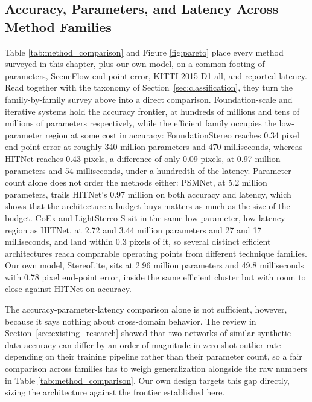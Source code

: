 \subsection{Accuracy, Parameters, and Latency Across Method Families}
Table \ref{tab:method_comparison} and Figure \ref{fig:pareto} place
every method surveyed in this chapter, plus our own model, on a common
footing of parameters, SceneFlow end-point error, KITTI 2015 D1-all, and
reported latency. Read together with the taxonomy of
Section~\ref{sec:classification}, they turn the family-by-family survey
above into a direct comparison. Foundation-scale and iterative systems
hold the accuracy frontier, at hundreds of millions and tens of millions
of parameters respectively, while the efficient family occupies the
low-parameter region at some cost in accuracy: FoundationStereo reaches
0.34 pixel end-point error at roughly 340 million parameters and 470
milliseconds, whereas HITNet reaches 0.43 pixels, a difference of only
0.09 pixels, at 0.97 million parameters and 54 milliseconds, under a
hundredth of the latency. Parameter count alone does not order the
methods either: PSMNet, at 5.2 million parameters, trails HITNet's 0.97
million on both accuracy and latency, which shows that the architecture
a budget buys matters as much as the size of the budget. CoEx and
LightStereo-S sit in the same low-parameter, low-latency region as
HITNet, at 2.72 and 3.44 million parameters and 27 and 17 milliseconds,
and land within 0.3 pixels of it, so several distinct efficient
architectures reach comparable operating points from different
technique families. Our own model, StereoLite, sits at 2.96 million
parameters and 49.8 milliseconds with 0.78 pixel end-point error,
inside the same efficient cluster but with room to close against HITNet
on accuracy.

The accuracy-parameter-latency comparison alone is not sufficient,
however, because it says nothing about cross-domain behavior. The review
in Section~\ref{sec:existing_research} showed that two networks of
similar synthetic-data accuracy can differ by an order of magnitude in
zero-shot outlier rate depending on their training pipeline rather than
their parameter count, so a fair comparison across families has to weigh
generalization alongside the raw numbers in Table
\ref{tab:method_comparison}. Our own design targets this gap directly,
sizing the architecture against the frontier established here.

